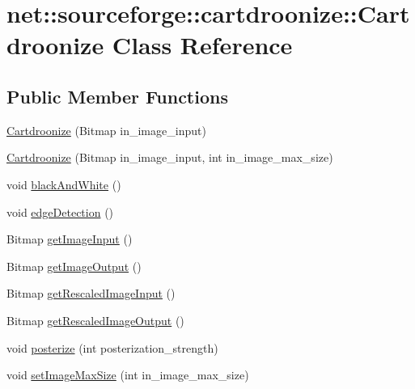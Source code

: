 \hypertarget{classnet_1_1sourceforge_1_1cartdroonize_1_1Cartdroonize}{
\section{net::sourceforge::cartdroonize::Cartdroonize Class Reference}
\label{classnet_1_1sourceforge_1_1cartdroonize_1_1Cartdroonize}
}
\subsection*{Public Member Functions}
\begin{DoxyCompactItemize}
\item 
\hyperlink{classnet_1_1sourceforge_1_1cartdroonize_1_1Cartdroonize_ac239b9f8ae651dcf5d7758d481a6866c}{Cartdroonize} (Bitmap in\_\-image\_\-input)
\item 
\hyperlink{classnet_1_1sourceforge_1_1cartdroonize_1_1Cartdroonize_a1fd8ab3bf55781769784ad493c57a4c3}{Cartdroonize} (Bitmap in\_\-image\_\-input, int in\_\-image\_\-max\_\-size)
\item 
void \hyperlink{classnet_1_1sourceforge_1_1cartdroonize_1_1Cartdroonize_abbc322e6d633e277771992237b039c15}{blackAndWhite} ()
\item 
void \hyperlink{classnet_1_1sourceforge_1_1cartdroonize_1_1Cartdroonize_adf8fd343e0e858e5edc35dd18f0d1e98}{edgeDetection} ()
\item 
Bitmap \hyperlink{classnet_1_1sourceforge_1_1cartdroonize_1_1Cartdroonize_a5f00ec77ddb515699581ecb8e2ebd227}{getImageInput} ()
\item 
Bitmap \hyperlink{classnet_1_1sourceforge_1_1cartdroonize_1_1Cartdroonize_a82804cde26412ce24fed465b59236548}{getImageOutput} ()
\item 
Bitmap \hyperlink{classnet_1_1sourceforge_1_1cartdroonize_1_1Cartdroonize_a8c833305bf05155765244feac04ba3ac}{getRescaledImageInput} ()
\item 
Bitmap \hyperlink{classnet_1_1sourceforge_1_1cartdroonize_1_1Cartdroonize_a2245840b5632ebe6fda46c2d72a65e6b}{getRescaledImageOutput} ()
\item 
void \hyperlink{classnet_1_1sourceforge_1_1cartdroonize_1_1Cartdroonize_a6ffb29702adb9521fe9b3d68e312f18d}{posterize} (int posterization\_\-strength)
\item 
void \hyperlink{classnet_1_1sourceforge_1_1cartdroonize_1_1Cartdroonize_a6b78247d653025ae6611f27b951d47dd}{setImageMaxSize} (int in\_\-image\_\-max\_\-size)
\end{DoxyCompactItemize}
